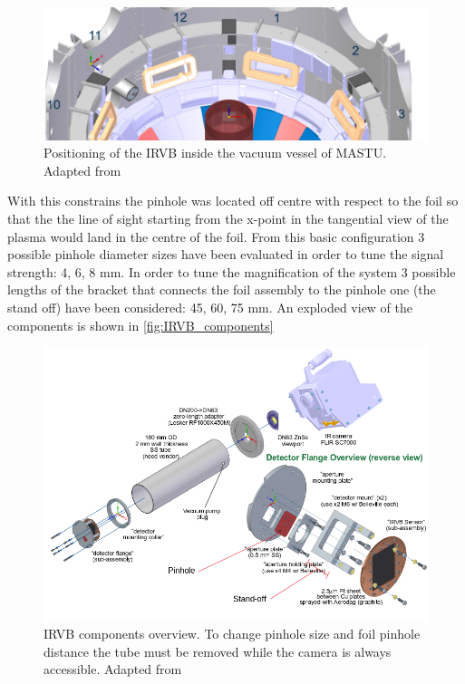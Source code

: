 \begin{figure}
	\centering
	\includegraphics[width=\linewidth]{Chapters/chapter2/figs/where_irvb.png}
	\caption{Positioning of the IRVB inside the vacuum vessel of MASTU. Adapted from \cite{Reinke2017a}}
	\label{fig:IRVB_location}
\end{figure}

With this constrains the pinhole was located off centre with respect to the foil so that the the line of sight starting from the x-point in the tangential view of the plasma would land in the centre of the foil. From this basic configuration 3 possible pinhole diameter sizes have been evaluated in order to tune the signal strength: 4, 6, 8 mm. In order to tune the magnification of the system 3 possible lengths of the bracket that connects the foil assembly to the pinhole one (the stand off) have been considered: 45, 60, 75 mm. An exploded view of the components is shown in \autoref{fig:IRVB_components}

\begin{figure}
	\centering
	\includegraphics[width=\linewidth]{Chapters/chapter2/figs/IRVB2.png}
	\caption{IRVB components overview. To change pinhole size and foil pinhole distance the tube must be removed while the camera is always accessible. Adapted from \cite{Reinke2017a}}
	\label{fig:IRVB_components}
\end{figure}

